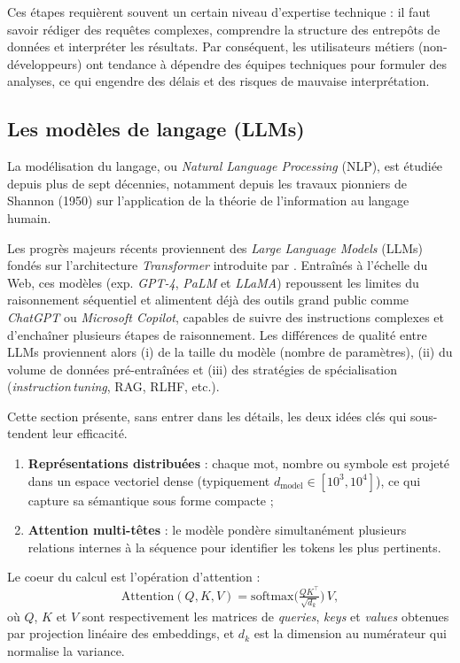 \documentclass[conference]{IEEEtran}
\begin{document}
Ces étapes requièrent souvent un certain niveau d’expertise technique : il faut savoir rédiger des requêtes complexes, comprendre la structure des entrepôts de données et interpréter les résultats. Par conséquent, les utilisateurs métiers (non-développeurs) ont tendance à dépendre des équipes techniques pour formuler des analyses, ce qui engendre des délais et des risques de mauvaise interprétation.

\subsection{Les modèles de langage (LLMs)}
\label{sec:utilisation_llms}

La modélisation du langage, ou \textit{Natural Language Processing} (NLP), est étudiée depuis plus de sept décennies, notamment depuis les travaux pionniers de Shannon (1950) sur l’application de la théorie de l’information au langage humain.

Les progrès majeurs récents proviennent des \textit{Large Language Models} (LLMs) fondés sur l’architecture \textit{Transformer} introduite par \citet{vaswani2023attentionneed}. Entraînés à l’échelle du Web, ces modèles (exp. \textit{GPT-4}, \textit{PaLM} et \textit{LLaMA}) repoussent les limites du raisonnement séquentiel et alimentent déjà des outils grand public comme \textit{ChatGPT} ou \textit{Microsoft Copilot}, capables de suivre des instructions complexes et d’enchaîner plusieurs étapes de raisonnement. Les différences de qualité entre LLMs proviennent alors (i) de la taille du modèle (nombre de paramètres), (ii) du volume de données pré-entraînées et (iii) des stratégies de spécialisation (\emph{instruction\,tuning}, RAG, RLHF, etc.).

Cette section présente, sans entrer dans les détails, les deux idées clés qui sous-tendent leur efficacité.

\begin{enumerate}
    \item \textbf{Représentations distribuées} : chaque mot, nombre ou symbole est projeté dans un espace vectoriel dense (typiquement $d_{\text{model}} \in [10^3,10^4]$), ce qui capture sa sémantique sous forme compacte ;
    \item \textbf{Attention multi-têtes} : le modèle pondère simultanément plusieurs relations internes à la séquence pour identifier les tokens les plus pertinents.
\end{enumerate}

Le coeur du calcul est l’opération d’attention :
\begin{equation}
\mathrm{Attention}(Q,K,V)=\mathrm{softmax}
      \!\bigl(\tfrac{QK^{\top}}{\sqrt{d_k}}\bigr)\,V,
\end{equation}
\noindent où $Q$, $K$ et $V$ sont respectivement les matrices de \emph{queries}, \emph{keys} et \emph{values} obtenues par projection linéaire des embeddings, et $d_k$ est la dimension au numérateur qui normalise la variance.
\end{document}
